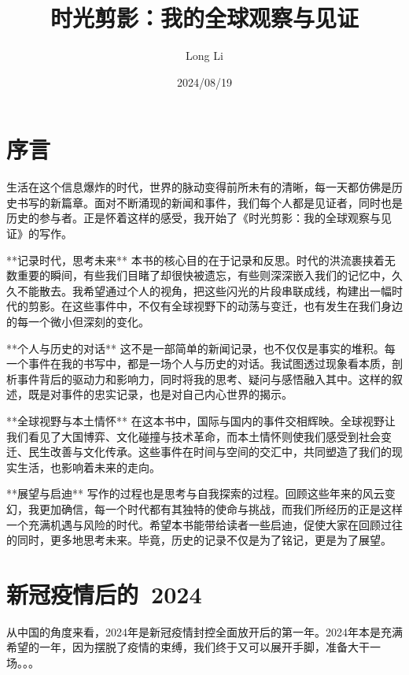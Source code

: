 \documentclass[lang=cn,newtx,10pt,scheme=chinese]{elegantbook}
\title{时光剪影：我的全球观察与见证}
\author{Long Li}
\date{2024/08/19}
\begin{document}
\maketitle
\frontmatter

\tableofcontents

\mainmatter

\chapter{序言}

生活在这个信息爆炸的时代，世界的脉动变得前所未有的清晰，每一天都仿佛是历史书写的新篇章。面对不断涌现的新闻和事件，我们每个人都是见证者，同时也是历史的参与者。正是怀着这样的感受，我开始了《时光剪影：我的全球观察与见证》的写作。

**记录时代，思考未来**  
本书的核心目的在于记录和反思。时代的洪流裹挟着无数重要的瞬间，有些我们目睹了却很快被遗忘，有些则深深嵌入我们的记忆中，久久不能散去。我希望通过个人的视角，把这些闪光的片段串联成线，构建出一幅时代的剪影。在这些事件中，不仅有全球视野下的动荡与变迁，也有发生在我们身边的每一个微小但深刻的变化。

**个人与历史的对话**  
这不是一部简单的新闻记录，也不仅仅是事实的堆积。每一个事件在我的书写中，都是一场个人与历史的对话。我试图透过现象看本质，剖析事件背后的驱动力和影响力，同时将我的思考、疑问与感悟融入其中。这样的叙述，既是对事件的忠实记录，也是对自己内心世界的揭示。

**全球视野与本土情怀**  
在这本书中，国际与国内的事件交相辉映。全球视野让我们看见了大国博弈、文化碰撞与技术革命，而本土情怀则使我们感受到社会变迁、民生改善与文化传承。这些事件在时间与空间的交汇中，共同塑造了我们的现实生活，也影响着未来的走向。

**展望与启迪**  
写作的过程也是思考与自我探索的过程。回顾这些年来的风云变幻，我更加确信，每一个时代都有其独特的使命与挑战，而我们所经历的正是这样一个充满机遇与风险的时代。希望本书能带给读者一些启迪，促使大家在回顾过往的同时，更多地思考未来。毕竟，历史的记录不仅是为了铭记，更是为了展望。


\chapter{新冠疫情后的~2024}

从中国的角度来看，2024年是新冠疫情封控全面放开后的第一年。2024年本是充满希望的一年，因为摆脱了疫情的束缚，我们终于又可以展开手脚，准备大干一场。。。
\end{document}
